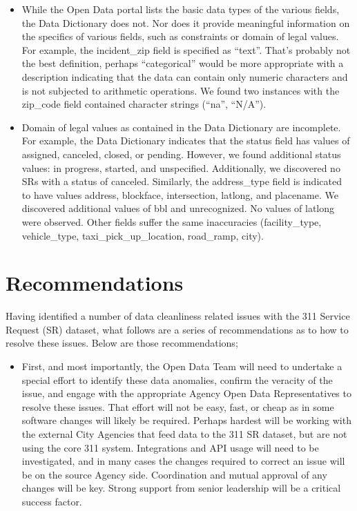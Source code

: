 \documentclass[12pt, titlepage]{article}
\begin{document}
{\begin{itemize}
	\item While the Open Data portal lists the basic data types of the various fields, the Data Dictionary does not. Nor
	does it provide meaningful information on the specifics of various fields, such as constraints or domain of legal values.
	For example, the incident\_zip field is specified as ``text''. That's probably not the best definition, perhaps
	``categorical'' would be more appropriate with a description indicating that the data can contain only numeric characters
	and is not subjected to arithmetic operations. We found two instances with the zip\_code field contained character strings (``na'', ``N/A''). 

	\item Domain of legal values as contained in the Data Dictionary are incomplete. For example, the Data Dictionary indicates
	that the status field has values of assigned, canceled, closed, or pending. However, we found additional status values:
	in progress, started, and unspecified. Additionally, we discovered no SRs with a status of canceled. Similarly, the 
	address\_type field is indicated to have values address, blockface, intersection, latlong, and placename. We discovered
	additional values of bbl and unrecognized. No values of latlong were observed. Other fields suffer the same
	inaccuracies (facility\_type, vehicle\_type, taxi\_pick\_up\_location, road\_ramp, city).
\end{itemize}



\section{Recommendations} \label{sec:recommendations}
Having identified a number of data cleanliness related issues with the 311 Service Request (SR) dataset, what follows
are a series of recommendations as to how to resolve these issues. Below are those recommendations;

\begin{itemize}
	\item First, and most importantly, the Open Data Team will need to undertake a special effort to identify these data anomalies,
	confirm the veracity of the issue, and engage with the appropriate Agency Open Data Representatives to resolve these issues.
	That effort will not be easy, fast, or cheap as in some software changes will likely be required. Perhaps hardest will be
	working with the external City Agencies that feed data to the 311 SR dataset, but are not using the core 311 system.
	Integrations and API usage will need to be investigated, and in many cases the changes required to correct an issue will
	be on the source Agency side. Coordination and mutual approval of any changes will be key. Strong support from senior
	leadership will be a critical success factor.


\end{itemize}}
\end{document}

